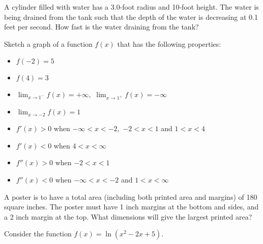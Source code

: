 \documentclass[addpoints,12pt]{exam}
\begin{document}
\begin{questions}

\question[6] A cylinder filled with water has a 3.0-foot radius and 10-foot height. The water is
being drained from the tank such that the depth of the water is decreasing at 0.1 feet per
second. How fast is the water draining from the tank?

 \newpage


\question[6] Sketch a graph of a function $f(x)$ that has the following properties:

\begin{itemize}
\item $f(-2)=5$
\item $f(4)=3$
\item $\displaystyle\lim_{x\to 1^{-}}f(x) = +\infty,$ $\displaystyle\lim_{x\to 1^{+}}f(x) = -\infty$
\item $\displaystyle\lim_{x\to -2} f(x) = 1$
\item $f'(x)>0$ when $-\infty <x < -2,$ $-2<x<1$ and $1<x<4$
\item $f'(x)<0$ when $4<x<\infty$
\item $f''(x)>0$ when $-2<x<1$
\item $f''(x)<0$ when $-\infty<x<-2$ and $1<x<\infty$

\end{itemize}

\begin{center}

\end{center}

\newpage


\question[7] A poster is to have a total area (including both printed area and margins) of 180
square inches. The poster must have 1 inch margins at the bottom and sides, and a 2 inch
margin at the top. What dimensions will give the largest printed area?

\newpage




\question Consider the function $f(x)= \ln(x^2-2x+5) $.

\end{questions}
\end{document}
